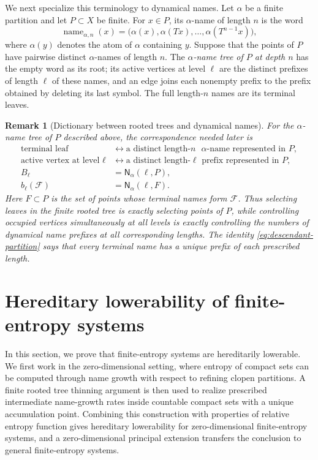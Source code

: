 \documentclass[10pt,a4paper]{amsart}
\newcommand{\Nname}{\mathsf N}
\newtheorem{remark}[theorem]{Remark}
\numberwithin{equation}{section}
\begin{document}
	We next specialize this terminology to dynamical names.  Let $\alpha$ be a
	finite partition and let $P\subset X$ be finite.  For $x\in P$, its
	$\alpha$-name of length $n$ is the word
	\[
	\operatorname{name}_{\alpha,n}(x)
	=
	\bigl(\alpha(x),\alpha(Tx),\ldots,\alpha(T^{n-1}x)\bigr),
	\]
	where $\alpha(y)$ denotes the atom of $\alpha$ containing $y$.  Suppose that
	the points of $P$ have pairwise distinct $\alpha$-names of length $n$.  The
	\emph{$\alpha$-name tree of $P$ at depth $n$} has the empty word as its root;
	its active vertices at level $\ell$ are the distinct prefixes of length
	$\ell$ of these names, and an edge joins each nonempty prefix to the prefix
	obtained by deleting its last symbol.  The full length-$n$ names are its
	terminal leaves.

	\begin{remark}[Dictionary between rooted trees and dynamical names]
		\label{rem:name-tree-dictionary}
		For the $\alpha$-name tree of $P$ described above, the correspondence needed
		later is
		\begin{align*}
		\text{terminal leaf}
		&\longleftrightarrow
		\text{a distinct length-$n$ $\alpha$-name represented in $P$},\\
		\text{active vertex at level $\ell$}
		&\longleftrightarrow
		\text{a distinct length-$\ell$ prefix represented in $P$},\\
		B_\ell
		&=
		\Nname_\alpha(\ell,P),\\
		b_\ell(\mathcal F)
		&=
		\Nname_\alpha(\ell,F).
		\end{align*}
		Here $F\subset P$ is the set of points whose terminal names form
		$\mathcal F$.  Thus selecting leaves in the finite rooted tree is exactly
		selecting points of $P$, while controlling occupied vertices simultaneously
		at all levels is exactly controlling the numbers of dynamical name prefixes
		at all corresponding lengths.  The identity
		\eqref{eq:descendant-partition} says that every terminal name has a unique
		prefix of each prescribed length.
	\end{remark}
	

	
	\section{Hereditary lowerability of finite-entropy systems}
	\label{sec:finite-part}
    In this section, we prove that finite-entropy systems are hereditarily lowerable. We first work in the zero-dimensional setting, where entropy of compact sets can be computed through name growth with respect to refining clopen partitions. A finite rooted tree thinning argument is then used to realize prescribed intermediate name-growth rates inside countable compact sets with a unique accumulation point. Combining this construction with properties of relative entropy function gives hereditary lowerability for zero-dimensional finite-entropy systems, and a zero-dimensional principal extension transfers the conclusion to general finite-entropy systems.
    
\end{document}
